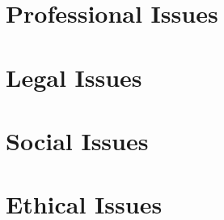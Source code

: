 \documentclass[]{report}
\begin{document}
\section{Professional Issues}


\section{Legal Issues}


\section{Social Issues}


\section{Ethical Issues}

	
	
\end{document}
